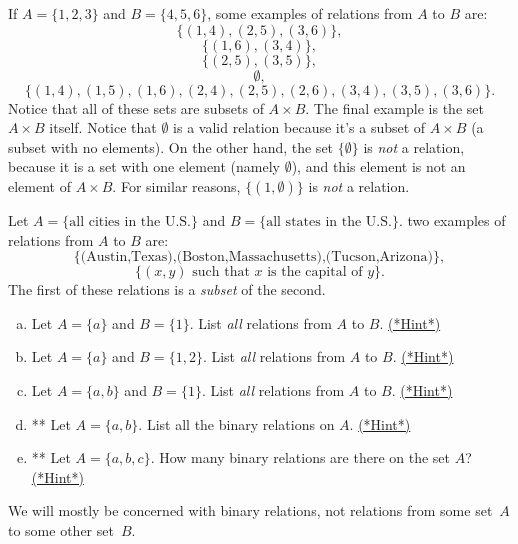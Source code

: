 \begin{eg}\label{ex_rel}
If $A = \{1,2,3\}$ and $B = \{4,5,6\}$, some examples of relations from $A$ to $B$ are:
\[ \{ (1,4), (2,5), (3,6)\}, \]
\[ \{ (1,6), (3,4)\}, \]
\[ \{ (2,5), (3,5) \}, \]
\[ \emptyset, \]
\[ \{ (1,4), (1,5), (1,6), (2,4), (2,5), (2,6), (3,4), (3,5), (3,6) \}.\] 
Notice that all of these sets are subsets of $A \times B$. The final example is the set $A \times B$ itself. Notice that $\emptyset$ is a valid relation because it's a subset of $A \times B$ (a subset with no elements).  On the other hand, the set $\{ \emptyset \}$ is \emph{not} a relation, because it is  a set with one element (namely $\emptyset$), and this element is not an element of $A \times B$. For similar reasons, $\{(1, \emptyset) \}$ is \emph{not} a relation.
\end{eg}

\begin{eg}
Let $A = \{\text{all cities in the U.S.}\}$ and $B = \{\text{all states in the U.S.}\}$. two examples of relations from $A$ to $B$ are:
\[ \{ \text{(Austin,Texas),(Boston,Massachusetts),(Tucson,Arizona)}\}, \]
\[ \{ (x,y) \text{ such that } x \text{ is the capital of } y \}. \]
The first of these relations  is a \emph{subset} of the second.
\end{eg}


\begin{exercise}{7}
\begin{enumerate}[(a)]
\item
Let $A = \{a\}$ and $B = \{1\}$. List \emph{all} relations from $A$ to $B$.
\hyperref[sec:EquivalenceRelationsChap:hints]{(*Hint*)}
\item
Let $A = \{a\}$ and $B = \{1,2\}$. List \emph{all} relations from $A$ to $B$.
\hyperref[sec:EquivalenceRelationsChap:hints]{(*Hint*)}
\item
Let $A = \{a,b\}$ and $B = \{1\}$. List \emph{all} relations from $A$ to $B$.
\hyperref[sec:EquivalenceRelationsChap:hints]{(*Hint*)}
\item
** Let $A = \{a,b\}$. List all the binary relations on $A$.
\hyperref[sec:EquivalenceRelationsChap:hints]{(*Hint*)}
\item
** Let $A = \{a,b,c\}$. How many binary relations are there on the set $A$?
\hyperref[sec:EquivalenceRelationsChap:hints]{(*Hint*)}
\end{enumerate}
\end{exercise}



We will mostly be concerned with binary relations, not relations from some set~$A$ to some other set~$B$.

